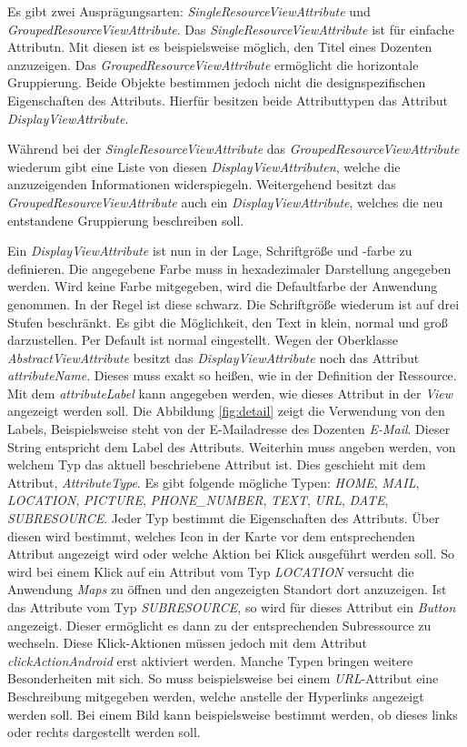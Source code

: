 Es gibt zwei Ausprägungsarten: \textit{SingleResourceViewAttribute} und \textit{GroupedResourceViewAttribute}.  Das \textit{SingleResourceViewAttribute} ist für einfache Attributn. Mit diesen ist es beispielsweise möglich, den Titel eines Dozenten anzuzeigen. Das \textit{GroupedResourceViewAttribute} ermöglicht die horizontale Gruppierung. Beide Objekte bestimmen jedoch nicht die designspezifischen Eigenschaften des Attributs. Hierfür besitzen beide Attributtypen das Attribut \textit{DisplayViewAttribute}.

Während bei der \textit{SingleResourceViewAttribute} das \textit{GroupedResourceViewAttribute} wiederum gibt eine Liste von diesen \textit{DisplayViewAttributen}, welche die anzuzeigenden Informationen widerspiegeln. Weitergehend besitzt das \textit{GroupedResourceViewAttribute} auch ein \textit{DisplayViewAttribute}, welches die neu entstandene Gruppierung beschreiben soll.

\newpage

Ein \textit{DisplayViewAttribute} ist nun in der Lage, Schriftgröße und -farbe zu definieren. Die angegebene Farbe muss in hexadezimaler Darstellung angegeben werden. Wird keine Farbe mitgegeben, wird die Defaultfarbe der Anwendung genommen. In der Regel ist diese schwarz. Die Schriftgröße wiederum ist auf drei Stufen beschränkt. Es gibt die Möglichkeit, den Text in klein, normal und groß darzustellen. Per Default ist normal eingestellt. Wegen der Oberklasse \textit{AbstractViewAttribute} besitzt das \textit{DisplayViewAttribute} noch das Attribut \textit{attributeName}. Dieses muss exakt so heißen, wie in der Definition der Ressource.
Mit dem \textit{attributeLabel} kann angegeben werden, wie dieses Attribut in der \textit{View} angezeigt werden soll. Die Abbildung \ref{fig:detail} zeigt die Verwendung von den Labels, Beispielsweise steht von der E-Mailadresse des Dozenten \textit{E-Mail}. Dieser String entspricht dem Label des Attributs. Weiterhin muss angeben werden, von welchem Typ das aktuell beschriebene Attribut ist.
Dies geschieht mit dem Attribut, \textit{AttributeType}. Es gibt folgende mögliche Typen: \textit{HOME}, \textit{MAIL}, \textit{LOCATION}, \textit{PICTURE}, \textit{PHONE\_NUMBER}, \textit{TEXT}, \textit{URL}, \textit{DATE}, \textit{SUBRESOURCE}. Jeder Typ bestimmt die Eigenschaften des Attributs. Über diesen wird bestimmt, welches Icon in der Karte vor dem entsprechenden Attribut angezeigt wird oder welche Aktion bei Klick ausgeführt werden soll. So wird bei einem Klick auf ein Attribut vom Typ \textit{LOCATION} versucht die Anwendung \textit{Maps} zu öffnen und den angezeigten Standort dort anzuzeigen. Ist das Attribute vom Typ \textit{SUBRESOURCE}, so wird für dieses Attribut ein \textit{Button} angezeigt. Dieser ermöglicht es dann zu der entsprechenden Subressource zu wechseln. Diese Klick-Aktionen müssen jedoch mit dem Attribut \textit{clickActionAndroid} erst aktiviert werden.
Manche Typen bringen weitere Besonderheiten mit sich. So muss beispielsweise bei einem \textit{URL}-Attribut eine Beschreibung mitgegeben werden, welche anstelle der Hyperlinks angezeigt werden soll. Bei einem Bild kann beispielsweise bestimmt werden, ob dieses links oder rechts dargestellt werden soll. 

